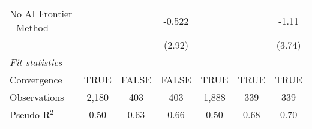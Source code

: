 \begin{tabular}{lcccccc}
   No AI Frontier - Method &              &              & -0.522        &              &             & -1.11\\   
                           &              &              & (2.92)        &              &             & (3.74)\\   
   \midrule
   \emph{Fit statistics}\\
   Convergence             &TRUE          & FALSE        & FALSE         & TRUE         & TRUE        & TRUE\\  
   Observations            & 2,180        & 403          & 403           & 1,888        & 339         & 339\\  
   Pseudo R$^2$            & 0.50         & 0.63         & 0.66          & 0.50         & 0.68        & 0.70\\  
   

\end{tabular}
